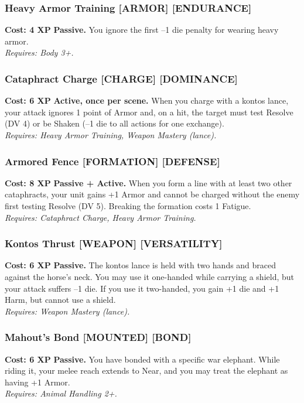 \documentclass[12pt,a4paper]{book}
\begin{document}
\subsubsection*{Heavy Armor Training \textnormal{[ARMOR] [ENDURANCE]}}
\label{talent:heavy-armor-training}
\textbf{Cost: 4 XP} \textbf{Passive.} You ignore the first --1 die penalty for wearing heavy armor. \\
\textit{Requires: Body 3+.}

\subsubsection*{Cataphract Charge \textnormal{[CHARGE] [DOMINANCE]}}
\label{talent:cataphract-charge}
\textbf{Cost: 6 XP} \textbf{Active, once per scene.} When you charge with a kontos lance, your attack ignores 1 point of Armor and, on a hit, the target must test Resolve (DV 4) or be Shaken (--1 die to all actions for one exchange). \\
\textit{Requires: Heavy Armor Training, Weapon Mastery (lance).}

\subsubsection*{Armored Fence \textnormal{[FORMATION] [DEFENSE]}}
\label{talent:armored-fence}
\textbf{Cost: 8 XP} \textbf{Passive + Active.} When you form a line with at least two other cataphracts, your unit gains +1 Armor and cannot be charged without the enemy first testing Resolve (DV 5). Breaking the formation costs 1 Fatigue. \\
\textit{Requires: Cataphract Charge, Heavy Armor Training.}

\subsubsection*{Kontos Thrust \textnormal{[WEAPON] [VERSATILITY]}}
\label{talent:kontos-thrust}
\textbf{Cost: 6 XP} \textbf{Passive.} The kontos lance is held with two hands and braced against the horse's neck. You may use it one-handed while carrying a shield, but your attack suffers --1 die. If you use it two-handed, you gain +1 die and +1 Harm, but cannot use a shield. \\
\textit{Requires: Weapon Mastery (lance).}

\subsubsection*{Mahout's Bond \textnormal{[MOUNTED] [BOND]}}
\label{talent:mahouts-bond}
\textbf{Cost: 6 XP} \textbf{Passive.} You have bonded with a specific war elephant. While riding it, your melee reach extends to Near, and you may treat the elephant as having +1 Armor. \\
\textit{Requires: Animal Handling 2+.}
\end{document}
